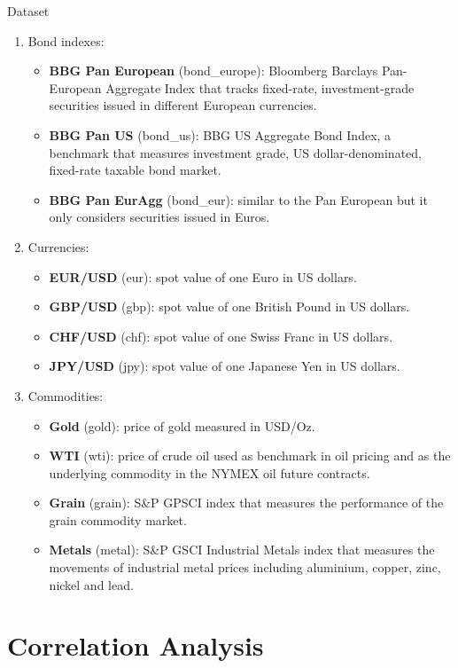 \documentclass[c, 10pt]{beamer}
\begin{document}
\begin{frame}[allowframebreaks]{Dataset}
\begin{enumerate}
	\item Bond indexes:
	\begin{itemize}
		\item \textbf{BBG Pan European} (bond\_europe): Bloomberg Barclays Pan-European Aggregate Index that tracks fixed-rate, investment-grade securities issued in different European currencies.
		\item \textbf{BBG Pan US} (bond\_us): BBG US Aggregate Bond Index, a benchmark that measures investment grade, US dollar-denominated, fixed-rate taxable bond market.
		\item \textbf{BBG Pan EurAgg} (bond\_eur): similar to the Pan European but it only considers securities issued in Euros.
	\end{itemize} 
	\item Currencies:
	\begin{itemize}
		\item \textbf{EUR/USD} (eur): spot value of one Euro in  US dollars. 
		\item \textbf{GBP/USD} (gbp): spot value of one British Pound in US dollars.
		\item \textbf{CHF/USD} (chf): spot value of one Swiss Franc in  US dollars.
		\item \textbf{JPY/USD} (jpy): spot value of one Japanese Yen in  US dollars.
	\end{itemize}
	\framebreak
	\item Commodities:
	\begin{itemize}
		\item \textbf{Gold} (gold): price of gold measured in USD/Oz.
		\item \textbf{WTI} (wti): price of crude oil used as benchmark in oil pricing and as the underlying commodity in the NYMEX oil future contracts.
		\item \textbf{Grain} (grain): S\&P GPSCI index that measures the performance of the grain commodity market.
		\item \textbf{Metals} (metal): S\&P GSCI Industrial Metals index that measures the movements of industrial metal prices including aluminium, copper, zinc, nickel and lead.
	\end{itemize}
\end{enumerate}
\end{frame}

\section{Correlation Analysis}
\end{document}
